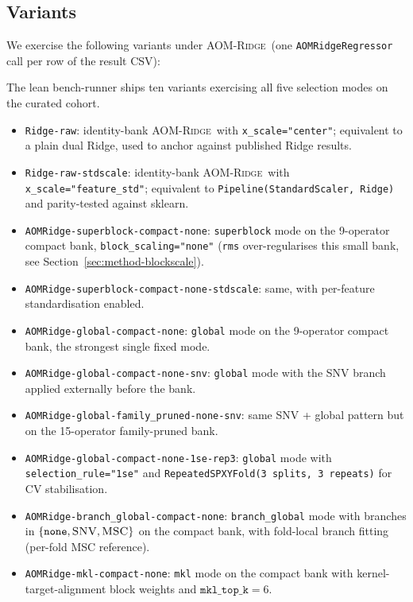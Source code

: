 \documentclass[11pt,a4paper]{article}
\newcommand{\AOMR}{\textsc{AOM-Ridge}\xspace}
\newcommand{\SNV}{\textsc{SNV}\xspace}
\newcommand{\MSC}{\textsc{MSC}\xspace}
\begin{document}
\subsection{Variants}

We exercise the following variants under \AOMR\ (one
\texttt{AOMRidgeRegressor} call per row of the result CSV):

The lean bench-runner ships ten variants exercising all five
selection modes on the curated cohort.

\begin{itemize}[leftmargin=2em,itemsep=0pt]
  \item \texttt{Ridge-raw}: identity-bank \AOMR\ with
        \texttt{x\_scale="center"}; equivalent to a plain dual Ridge,
        used to anchor against published Ridge results.
  \item \texttt{Ridge-raw-stdscale}: identity-bank \AOMR\ with
        \texttt{x\_scale="feature\_std"}; equivalent to
        \texttt{Pipeline(StandardScaler, Ridge)} and parity-tested
        against sklearn.
  \item \texttt{AOMRidge-superblock-compact-none}: \texttt{superblock}
        mode on the 9-operator compact bank,
        \texttt{block\_scaling="none"} (\texttt{rms} over-regularises
        this small bank, see Section~\ref{sec:method-blockscale}).
  \item \texttt{AOMRidge-superblock-compact-none-stdscale}: same, with
        per-feature standardisation enabled.
  \item \texttt{AOMRidge-global-compact-none}: \texttt{global} mode on
        the 9-operator compact bank, the strongest single fixed mode.
  \item \texttt{AOMRidge-global-compact-none-snv}: \texttt{global} mode
        with the SNV branch applied externally before the bank.
  \item \texttt{AOMRidge-global-family\_pruned-none-snv}: same SNV +
        global pattern but on the 15-operator family-pruned bank.
  \item \texttt{AOMRidge-global-compact-none-1se-rep3}:
        \texttt{global} mode with \texttt{selection\_rule="1se"} and
        \texttt{RepeatedSPXYFold(3 splits, 3 repeats)} for CV
        stabilisation.
  \item \texttt{AOMRidge-branch\_global-compact-none}:
        \texttt{branch\_global} mode with branches in $\{\texttt{none},
        \SNV, \MSC\}$ on the compact bank, with fold-local branch
        fitting (per-fold MSC reference).
  \item \texttt{AOMRidge-mkl-compact-none}: \texttt{mkl} mode on the
        compact bank with kernel-target-alignment block weights and
        $\texttt{mkl\_top\_k}=6$.
\end{itemize}
\end{document}
